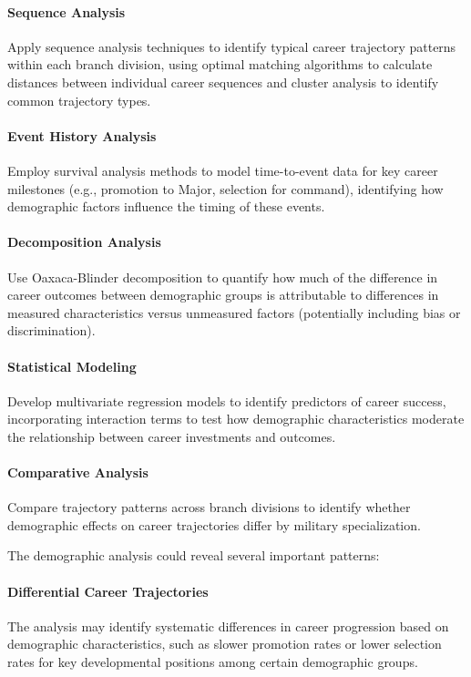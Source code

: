 \documentclass[../main.tex]{subfiles}
\begin{document}
\paragraph{Sequence Analysis} Apply sequence analysis techniques to identify typical career trajectory patterns within each branch division, using optimal matching algorithms to calculate distances between individual career sequences and cluster analysis to identify common trajectory types.

\paragraph{Event History Analysis} Employ survival analysis methods to model time-to-event data for key career milestones (e.g., promotion to Major, selection for command), identifying how demographic factors influence the timing of these events.

\paragraph{Decomposition Analysis} Use Oaxaca-Blinder decomposition to quantify how much of the difference in career outcomes between demographic groups is attributable to differences in measured characteristics versus unmeasured factors (potentially including bias or discrimination).

\paragraph{Statistical Modeling} Develop multivariate regression models to identify predictors of career success, incorporating interaction terms to test how demographic characteristics moderate the relationship between career investments and outcomes.

\paragraph{Comparative Analysis} Compare trajectory patterns across branch divisions to identify whether demographic effects on career trajectories differ by military specialization.


 The demographic analysis could reveal several important patterns:

\paragraph{Differential Career Trajectories} The analysis may identify systematic differences in career progression based on demographic characteristics, such as slower promotion rates or lower selection rates for key developmental positions among certain demographic groups.
\end{document}
